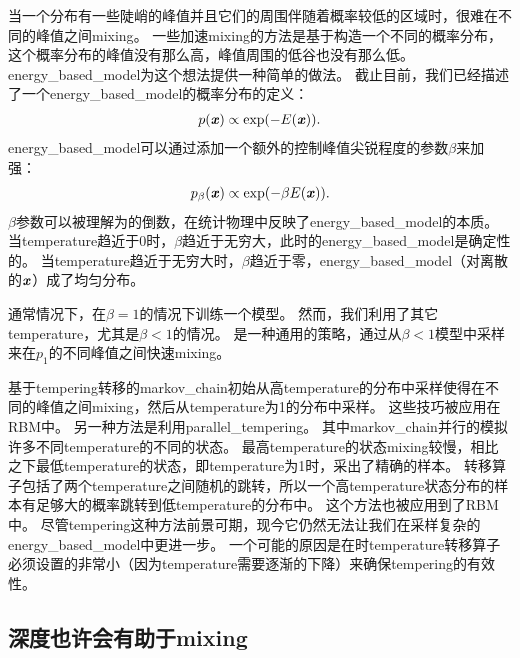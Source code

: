当一个分布有一些陡峭的峰值并且它们的周围伴随着概率较低的区域时，很难在不同的峰值之间\gls{mixing}。
一些加速\gls{mixing}的方法是基于构造一个不同的概率分布，这个概率分布的峰值没有那么高，峰值周围的低谷也没有那么低。
\gls{energy_based_model}为这个想法提供一种简单的做法。
截止目前，我们已经描述了一个\gls{energy_based_model}的概率分布的定义：
\begin{align}
\label{eqn:1725}
p(\boldsymbol{\mathit{x}}) \propto \exp(-E(\boldsymbol{\mathit{x}})).
\end{align}
\gls{energy_based_model}可以通过添加一个额外的控制峰值尖锐程度的参数$\beta$来加强：
\begin{align}
\label{eqn:1726}
p_{\beta}(\boldsymbol{\mathit{x}}) \propto \exp(-\beta E(\boldsymbol{\mathit{x}})).
\end{align}
$\beta$参数可以被理解为的倒数，在统计物理中反映了\gls{energy_based_model}的本质。
当\gls{temperature}趋近于0时，$\beta$趋近于无穷大，此时的\gls{energy_based_model}是确定性的。
当\gls{temperature}趋近于无穷大时，$\beta$趋近于零，\gls{energy_based_model}（对离散的$\boldsymbol{\mathit{x}}$）成了均匀分布。

通常情况下，在$\beta = 1$的情况下训练一个模型。
然而，我们利用了其它\gls{temperature}，尤其是$\beta < 1$的情况。
是一种通用的策略，通过从$\beta<1$模型中采样来在$p_1$的不同峰值之间快速\gls{mixing}。

基于\gls{tempering}转移的\gls{markov_chain}\citep{Neal94b}初始从高\gls{temperature}的分布中采样使得在不同的峰值之间\gls{mixing}，然后从\gls{temperature}为1的分布中采样。
这些技巧被应用在\gls{RBM}中\citep{Salakhutdinov-2010}。
另一种方法是利用\gls{parallel_tempering}\citep{Iba-2001}。
其中\gls{markov_chain}并行的模拟许多不同\gls{temperature}的不同的状态。
最高\gls{temperature}的状态\gls{mixing}较慢，相比之下最低\gls{temperature}的状态，即\gls{temperature}为1时，采出了精确的样本。
转移算子包括了两个\gls{temperature}之间随机的跳转，所以一个高\gls{temperature}状态分布的样本有足够大的概率跳转到低\gls{temperature}的分布中。
这个方法也被应用到了\gls{RBM}中\citep{Desjardins+al-2010-small,Cho10IJCNN}。
尽管\gls{tempering}这种方法前景可期，现今它仍然无法让我们在采样复杂的\gls{energy_based_model}中更进一步。
一个可能的原因是在时\gls{temperature}转移算子必须设置的非常小（因为\gls{temperature}需要逐渐的下降）来确保\gls{tempering}的有效性。



\subsection{深度也许会有助于\gls{mixing}}
\label{sec:depth_may_help_mixing}

